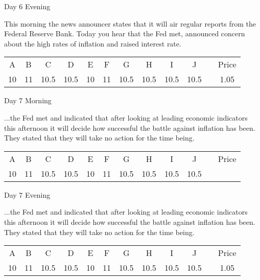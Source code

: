 \documentclass[notes=show]{beamer}
\begin{document}
\begin{frame}{Day 6 Evening}

\qquad This morning the news announcer states that it will air
regular reports from the Federal Reserve Bank. Today you hear that the Fed
met, announced concern about the high rates of inflation and raised interest
rate.

\bigskip

\begin{center}
\begin{tabular}{cccccccccccc}
A & B & C & D & E & F & G & H & I & J &  & Price \\ 
10 & 11 & 10.5 & 10.5 & 10 & 11 & 10.5 & 10.5 & 10.5 & 10.5 &  & 1.05%
\end{tabular}
\end{center}
\end{frame}

\begin{frame}{Day 7 Morning}

\qquad ...the Fed met and indicated that after looking
at leading economic indicators this afternoon it will decide how successful
the battle against inflation has been. They stated that they will take no
action for the time being.

\bigskip

\begin{center}
\begin{tabular}{cccccccccccc}
A & B & C & D & E & F & G & H & I & J &  & Price \\ 
10 & 11 & 10.5 & 10.5 & 10 & 11 & 10.5 & 10.5 & 10.5 & 10.5 &  & 
\end{tabular}
\end{center}
\end{frame}

\begin{frame}{Day 7 Evening}

\qquad ...the Fed met and indicated that after looking
at leading economic indicators this afternoon it will decide how successful
the battle against inflation has been. They stated that they will take no
action for the time being.

\bigskip

\begin{center}
\begin{tabular}{cccccccccccc}
A & B & C & D & E & F & G & H & I & J &  & Price \\ 
10 & 11 & 10.5 & 10.5 & 10 & 11 & 10.5 & 10.5 & 10.5 & 10.5 &  & 1.05%
\end{tabular}
\end{center}
\end{frame}%
\end{document}
